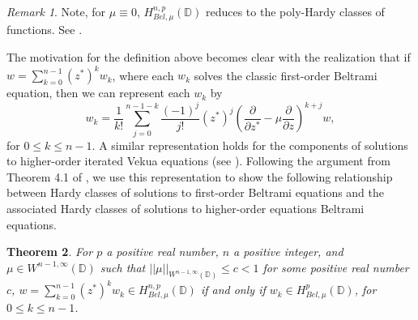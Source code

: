 \documentclass[12pt,reqno]{amsart}
\newtheorem{theorem}{Theorem}[section]
\theoremstyle{definition}
\theoremstyle{remark}
\newtheorem{comm}[theorem]{Remark}
\newcommand{\p}{\partial}
\newcommand{\disk}{\mathbb{D}}
\begin{document}
\begin{comm}
Note, for $\mu \equiv 0$, $H^{n,p}_{Bel,\mu}(\disk)$ reduces to the poly-Hardy classes of functions. See \cite{polyhardy}. 
\end{comm}

    The motivation for the definition above becomes clear with the realization that if $w = \sum_{k=0}^{n-1}  (z^*)^k w_k$, where each $w_k$ solves the classic first-order Beltrami equation, then we can represent each $w_k$ by 
    \begin{equation}\label{eqn: componentrep}
        w_k = \frac{1}{k!} \sum_{j=0}^{n-1-k}\frac{(-1)^j}{j!}  (z^*)^j \left(\frac{\p}{\p z^*} - \mu\frac{\p}{\p z}\right)^{k+j} w,
    \end{equation}
    for $0 \leq k \leq n-1$. A similar representation holds for the components of solutions to higher-order iterated Vekua equations (see \cite{itvek, WB3,WBD}). Following the argument from Theorem 4.1 of \cite{WBD}, we use this representation to show the following relationship between Hardy classes of solutions to first-order Beltrami equations and the associated Hardy classes of solutions to higher-order equations Beltrami equations. 


\begin{theorem}\label{thm: higherBelHardyimpliescomponentsinBelHardy}
For $p$ a positive real number, $n$ a positive integer, and $\mu \in W^{n-1,\infty}(\disk)$ such that $||\mu||_{W^{n-1,\infty}(\disk)}\leq c < 1$ for some positive real number $c$, $w = \sum_{k=0}^{n-1}  (z^*)^k w_k \in H^{n,p}_{Bel,\mu}(\disk)$ if and only if $w_k \in H^p_{Bel,\mu}(\disk)$, for $0 \leq k \leq n-1$. 
\end{theorem}
\end{document}
